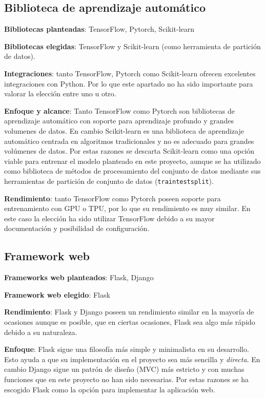 \subsection{Biblioteca de aprendizaje automático}
\textbf{Bibliotecas planteadas}: TensorFlow, Pytorch, Scikit-learn

\textbf{Bibliotecas elegidas}: TensorFlow y Scikit-learn (como herramienta de partición de datos).

\textbf{Integraciones}: tanto TensorFlow, Pytorch como Scikit-learn ofrecen excelentes integraciones con Python. Por lo que este apartado no ha sido importante para valorar la elección entre uno u otro.

\textbf{Enfoque y alcance}: Tanto TensorFlow como Pytorch son bibliotecas de aprendizaje automático con soporte para aprendizaje profundo y grandes volumenes de datos. En cambio Scikit-learn es una biblioteca de aprendizaje automático centrada en algoritmos tradicionales y no es adecuado para grandes volúmenes de datos.
Por estas razones se descarta Scikit-learn como una opción viable para entrenar el modelo planteado en este proyecto, aunque se ha utilizado como biblioteca de métodos de procesamiento del conjunto de datos mediante sus herramientas de partición de conjunto de datos (\texttt{train\textunderscore test\textunderscore split}).

\textbf{Rendimiento}: tanto TensorFlow como Pytorch poseen soporte para entrenamiento con GPU o TPU, por lo que su rendimiento es muy similar. En este caso la elección ha sido utilizar TensorFlow debido a su mayor documentación y posibilidad de configuración.

\subsection{Framework web}
\textbf{Frameworks web planteados}: Flask, Django

\textbf{Framework web elegido}: Flask

\textbf{Rendimiento}: Flask y Django poseen un rendimiento similar en la mayoría de ocasiones aunque es posible, que en ciertas ocasiones, Flask sea algo más rápido debido a su naturaleza.

\textbf{Enfoque}: Flask sigue una filosofía más simple y minimalista en su desarrollo. Esto ayuda a que su implementación en el proyecto sea más sencilla y \textit{directa}. En cambio Django sigue un patrón de diseño (MVC) más estricto y con muchas funciones que en este proyecto no han sido necesarias.
Por estas razones se ha escogido Flask como la opción para implementar la aplicación web.

